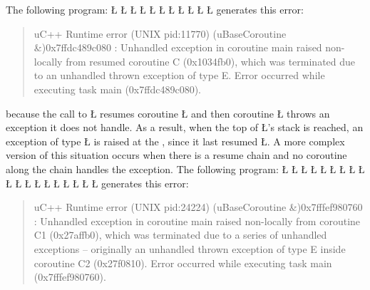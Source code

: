 \documentclass[openright,twoside]{report}
\begin{document}
The following program:
\LGinlinefalse\LGbegin\lgrinde
\L{}
\L{\LB{}}
\L{}
\L{\LB{}}
\L{}
\L{\LB{}}
\L{\LB{\};}}
\L{}
\L{\LB{}}
\L{\LB{}}
\CE{}\L{\LB{\}}}
\endlgrinde\LGend
generates this error:
\begin{quote}
\BGfont
uC++ Runtime error (UNIX pid:11770) (uBaseCoroutine \&)0x7ffdc489c080 : Unhandled exception in coroutine main raised non-locally from resumed coroutine C (0x1034fb0), which was terminated due to an unhandled thrown exception of type E.
Error occurred while executing task main (0x7ffdc489c080).
\end{quote}
because the call to \LGinlinetrue\LGbegin\lgrinde\L{}\endlgrinde\LGend{} resumes coroutine \LGinlinetrue\LGbegin\lgrinde\L{}\endlgrinde\LGend{} and then coroutine \LGinlinetrue\LGbegin\lgrinde\L{}\endlgrinde\LGend{} throws an exception it does not handle.
As a result, when the top of \LGinlinetrue\LGbegin\lgrinde\L{}\endlgrinde\LGend{}'s stack is reached, an exception of type \LGinlinetrue\LGbegin\lgrinde\L{}\endlgrinde\LGend{} is raised at the , since it last resumed \LGinlinetrue\LGbegin\lgrinde\L{}\endlgrinde\LGend{}.
A more complex version of this situation occurs when there is a resume chain and no coroutine along the chain handles the exception.
The following program:
\LGinlinefalse\LGbegin\lgrinde
\L{}
\L{\LB{}}
\L{}
\L{\LB{}}
\L{}
\L{\LB{}}
\L{\LB{\};}}
\L{}
\L{\LB{}}
\L{\LB{}}
\L{\LB{}}
\L{\LB{}}
\L{}
\L{\LB{}}
\L{\LB{\};}}
\L{}
\L{\LB{}}
\L{\LB{}}
\CE{}\L{\LB{\}}}
\endlgrinde\LGend
generates this error:
\begin{quote}
\BGfont
uC++ Runtime error (UNIX pid:24224) (uBaseCoroutine \&)0x7fffef980760 : Unhandled exception in coroutine main raised non-locally from coroutine C1 (0x27affb0), which was terminated due to a series of unhandled exceptions -- originally an unhandled thrown exception of type E inside coroutine C2 (0x27f0810).
Error occurred while executing task main (0x7fffef980760).
\end{quote}
\end{document}
